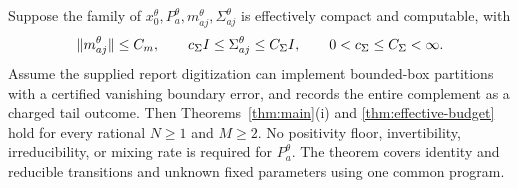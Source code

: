 \begin{theorem}\label{thm:effective-gaussian}
Suppose the family of $x_0^\theta,P_a^\theta,m_{aj}^\theta,\Sigma_{aj}^\theta$ is effectively compact and computable, with
\[
 \lVert m_{aj}^\theta\rVert\le C_m,\qquad
 c_\Sigma I\le\Sigma_{aj}^\theta\le C_\Sigma I,
 \qquad 0<c_\Sigma\le C_\Sigma<\infty.
\]
Assume the supplied report digitization can implement bounded-box partitions with a certified vanishing boundary error, and records the entire complement as a charged tail outcome. Then Theorems~\ref{thm:main}(i) and \ref{thm:effective-budget} hold for every rational $N\ge1$ and $M\ge2$.
No positivity floor, invertibility, irreducibility, or mixing rate is required for $P_a^\theta$. The theorem covers identity and reducible transitions and unknown fixed parameters using one common program.
\end{theorem}
